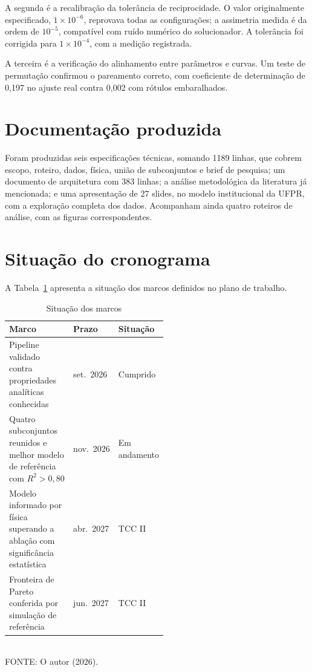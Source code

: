 A segunda é a recalibração da tolerância de reciprocidade. O valor originalmente
especificado, $1 \times 10^{-6}$, reprovava todas as configurações; a assimetria
medida é da ordem de $10^{-5}$, compatível com ruído numérico do solucionador. A
tolerância foi corrigida para $1 \times 10^{-4}$, com a medição registrada.

A terceira é a verificação do alinhamento entre parâmetros e curvas. Um teste de
permutação confirmou o pareamento correto, com coeficiente de determinação de
0,197 no ajuste real contra 0,002 com rótulos embaralhados.

\section{Documentação produzida}
\label{sec:documentacao}

Foram produzidas seis especificações técnicas, somando 1189 linhas, que cobrem
escopo, roteiro, dados, física, união de subconjuntos e brief de pesquisa; um
documento de arquitetura com 383 linhas; a análise metodológica da literatura já
mencionada; e uma apresentação de 27 slides, no modelo institucional da UFPR,
com a exploração completa dos dados. Acompanham ainda quatro roteiros de análise,
com as figuras correspondentes.

\section{Situação do cronograma}
\label{sec:cronograma}

A Tabela~\ref{tab:marcos} apresenta a situação dos marcos definidos no plano de
trabalho.

\begin{table}[htb]
\centering
\caption{Situação dos marcos}
\label{tab:marcos}
\footnotesize
\begin{tabular}{@{}p{0.52\linewidth}ll@{}}
\toprule
Marco & Prazo & Situação \\
\midrule
Pipeline validado contra propriedades analíticas conhecidas & set.\ 2026 &
Cumprido \\
Quatro subconjuntos reunidos e melhor modelo de referência com $R^2 > 0{,}80$ &
nov.\ 2026 & Em andamento \\
Modelo informado por física superando a ablação com significância estatística &
abr.\ 2027 & TCC II \\
Fronteira de Pareto conferida por simulação de referência & jun.\ 2027 & TCC II
\\
\bottomrule
\end{tabular}
\vspace{0.3em}
\\{\footnotesize FONTE: O autor (2026).}
\end{table}

